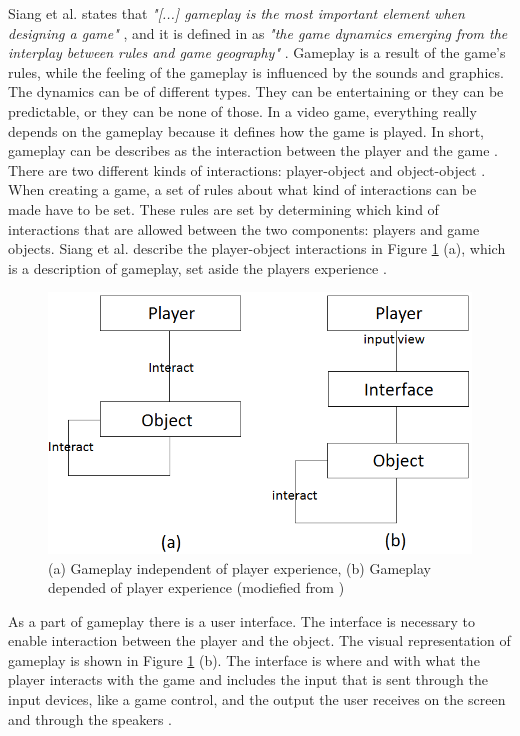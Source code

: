 Siang et al. states that \emph{"[...] gameplay is the most important element when designing a game"} \cite{umlapproach}, and it is defined in \cite{understandingvg} as \emph{"the game dynamics emerging from the interplay between rules and game geography"} . Gameplay is a result of the game's rules, while the feeling of the gameplay is influenced by the sounds and graphics. The dynamics can be of different types. They can be entertaining or they can be predictable, or they can be none of those. In a video game, everything really depends on the gameplay because it defines how the game is played. In short, gameplay can be describes as the interaction between the player and the game \cite{umlapproach}. There are two different kinds of interactions: player-object and object-object \cite{umlapproach}. When creating a game, a set of rules about what kind of interactions can be made have to be set. These rules are set by determining which kind of interactions that are allowed between the two components: players and game objects. Siang et al. describe the player-object interactions in Figure \ref{fig:playerobject} (a), which is a description of gameplay, set aside the players experience \cite{umlapproach}.
\begin{figure}
\begin{center}
\includegraphics[scale=0.4]{player-object-merged}
\caption[The player-token interaction]{(a) Gameplay independent of player experience, (b) Gameplay depended of player experience (modiefied from \cite{umlapproach})}
\label{fig:playerobject}
\end{center}
\end{figure} 


As a part of gameplay there is a user interface. The interface is necessary to enable interaction between the player and the object. The visual representation of gameplay  is shown in Figure \ref{fig:playerobject} (b). The interface is where and with what the player interacts with the game and includes the input that is sent through the input devices, like a game control, and the output the user receives on the screen and through the speakers \cite{umlapproach}.

